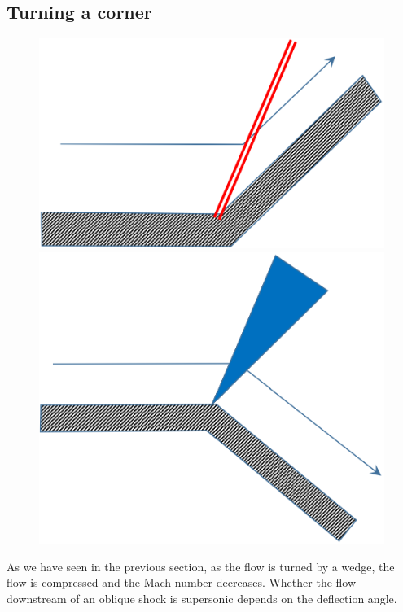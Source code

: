 \subsection{Turning a corner}
\begin{figure}[H]
    \centering
    \begin{minipage}{.5\textwidth}
        \centering
        \includegraphics[width=.8\linewidth]{./img/diagram28.png}
    \end{minipage}%
    \begin{minipage}{.5\textwidth}
        \centering
        \includegraphics[width=.8\linewidth]{./img/diagram29.png}
    \end{minipage}
\end{figure}
As we have seen in the previous section, as the flow is turned by a wedge, the flow is compressed and the Mach number decreases. Whether the flow downstream of an oblique shock is supersonic depends on the deflection angle.